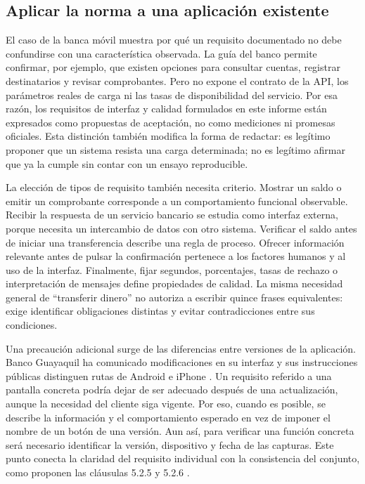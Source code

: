 \documentclass[conference,a4paper]{IEEEtran}
\begin{document}
\subsection{Aplicar la norma a una aplicación existente}
El caso de la banca móvil muestra por qué un requisito documentado no debe confundirse con una característica observada. La guía del banco permite confirmar, por ejemplo, que existen opciones para consultar cuentas, registrar destinatarios y revisar comprobantes. Pero no expone el contrato de la API, los parámetros reales de carga ni las tasas de disponibilidad del servicio. Por esa razón, los requisitos de interfaz y calidad formulados en este informe están expresados como propuestas de aceptación, no como mediciones ni promesas oficiales. Esta distinción también modifica la forma de redactar: es legítimo proponer que un sistema resista una carga determinada; no es legítimo afirmar que ya la cumple sin contar con un ensayo reproducible.

La elección de tipos de requisito también necesita criterio. Mostrar un saldo o emitir un comprobante corresponde a un comportamiento funcional observable. Recibir la respuesta de un servicio bancario se estudia como interfaz externa, porque necesita un intercambio de datos con otro sistema. Verificar el saldo antes de iniciar una transferencia describe una regla de proceso. Ofrecer información relevante antes de pulsar la confirmación pertenece a los factores humanos y al uso de la interfaz. Finalmente, fijar segundos, porcentajes, tasas de rechazo o interpretación de mensajes define propiedades de calidad. La misma necesidad general de ``transferir dinero'' no autoriza a escribir quince frases equivalentes: exige identificar obligaciones distintas y evitar contradicciones entre sus condiciones.

Una precaución adicional surge de las diferencias entre versiones de la aplicación. Banco Guayaquil ha comunicado modificaciones en su interfaz y sus instrucciones públicas distinguen rutas de Android e iPhone \cite{banco2026,ayudaBG}. Un requisito referido a una pantalla concreta podría dejar de ser adecuado después de una actualización, aunque la necesidad del cliente siga vigente. Por eso, cuando es posible, se describe la información y el comportamiento esperado en vez de imponer el nombre de un botón de una versión. Aun así, para verificar una función concreta será necesario identificar la versión, dispositivo y fecha de las capturas. Este punto conecta la claridad del requisito individual con la consistencia del conjunto, como proponen las cláusulas 5.2.5 y 5.2.6 \cite[cl.~5.2.5--5.2.6]{iso29148}.
\end{document}
